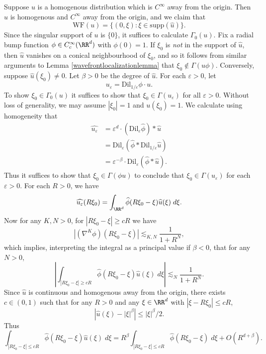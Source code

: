 \begin{example}
  Suppose $u$ is a homogenous distribution which is $C^\infty$ away from the origin. Then $\widehat{u}$ is homogenous and $C^\infty$ away from the origin, and we claim that
  \[ \text{WF}(u) = \{ (0,\xi): \xi \in \text{supp}(\widehat{u}) \}. \]
  Since the singular support of $u$ is $\{ 0 \}$, it suffices to calculate $\Gamma_0(u)$. Fix a radial bump function $\phi \in C_c^\infty(\RR^d)$ with $\phi(0) = 1$. If $\xi_0$ is \emph{not} in the support of $\widehat{u}$, then $\widehat{u}$ vanishes on a conical neighbourhood of $\xi_0$, and so it follows from similar arguments to Lemma \ref{wavefrontlocalizationlemma} that $\xi_0 \not \in \Gamma(u \phi)$. Conversely, suppose $\widehat{u}(\xi_0) \neq 0$. Let $\beta > 0$ be the degree of $\widehat{u}$. For each $\varepsilon > 0$, let
  \[ u_\varepsilon = \text{Dil}_{1/\varepsilon} \phi \cdot u. \]
  To show $\xi_0 \in \Gamma_0(u)$ it suffices to show that $\xi_0 \in \Gamma(u_\varepsilon)$ for all $\varepsilon > 0$. Without loss of generality, we may assume $|\xi_0| = 1$ and $u(\xi_0) = 1$. We calculate using homogeneity that
  \begin{align*}
    \widehat{u_\varepsilon} &= \varepsilon^d \cdot (\text{Dil}_\varepsilon \widehat{\phi}) * \widehat{u}\\
    &= \text{Dil}_\varepsilon (\widehat{\phi} * \text{Dil}_{1/\varepsilon} \widehat{u})\\
    &= \varepsilon^{-\beta} \cdot \text{Dil}_\varepsilon (\widehat{\phi} * \widehat{u}).
  \end{align*}
  Thus it suffices to show that $\xi_0 \in \Gamma(\phi u)$ to conclude that $\xi_0 \in \Gamma(u_\varepsilon)$ for each $\varepsilon > 0$. For each $R > 0$, we have
  \[ \widehat{u_\varepsilon}(R \xi_0) = \int_{\RR^d} \widehat{\phi}(R \xi_0 - \xi) \widehat{u}(\xi)\; d\xi. \]
  Now for any $K,N > 0$, for $|R \xi_0 - \xi| \geq cR$ we have
  \[ |(\nabla^K \phi)(R \xi_0 - \xi)| \lesssim_{K,N} \frac{1}{1 + R^N}, \]
  which implies, interpreting the integral as a principal value if $\beta < 0$, that for any $N > 0$,
  \[ \left| \int_{|R \xi_0 - \xi| \geq cR} \widehat{\phi}(R \xi_0 - \xi) \widehat{u}(\xi)\; d\xi \right| \lesssim_N \frac{1}{1 + R^N}. \]
  Since $\widehat{u}$ is continuous and homogenous away from the origin, there exists $c \in (0,1)$ such that for any $R > 0$ and any $\xi \in \RR^d$ with $|\xi - R \xi_0| \leq cR$,
  \[ \left| \widehat{u}(\xi) - |\xi|^\beta \right| \leq |\xi|^\beta / 2. \]
  Thus
  \[ \int_{|R \xi_0 - \xi| \leq cR} \widehat{\phi}(R \xi_0 - \xi) \widehat{u}(\xi)\; d\xi = R^\beta \int_{|R \xi_0 - \xi| \leq cR} \widehat{\phi}(R \xi_0 - \xi)\; d\xi + O \left( R^{d+\beta} \right). \]
\end{example}


